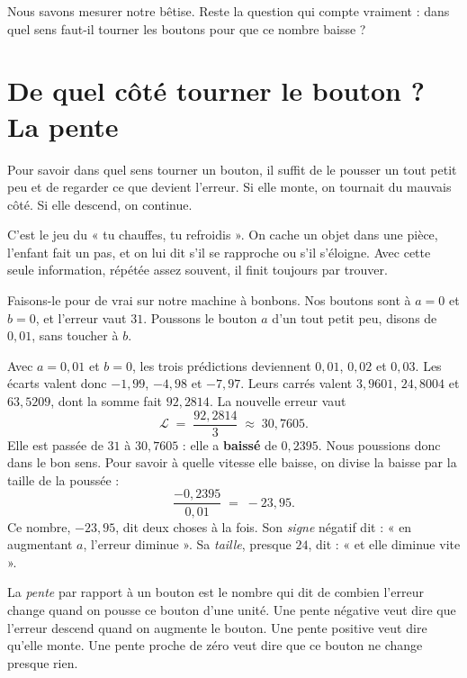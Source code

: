 Nous savons mesurer notre bêtise. Reste la question qui compte vraiment :
dans quel sens faut-il tourner les boutons pour que ce nombre baisse ?

\section{De quel côté tourner le bouton ? La pente}

\begin{enclair}
Pour savoir dans quel sens tourner un bouton, il suffit de le pousser un tout
petit peu et de regarder ce que devient l'erreur. Si elle monte, on tournait
du mauvais côté. Si elle descend, on continue.
\end{enclair}

C'est le jeu du « tu chauffes, tu refroidis ». On cache un objet dans une
pièce, l'enfant fait un pas, et on lui dit s'il se rapproche ou s'il
s'éloigne. Avec cette seule information, répétée assez souvent, il finit
toujours par trouver.

Faisons-le pour de vrai sur notre machine à bonbons. Nos boutons sont à
$a = 0$ et $b = 0$, et l'erreur vaut $31$. Poussons le bouton $a$ d'un tout
petit peu, disons de $0{,}01$, sans toucher à $b$.

\begin{exemple}
Avec $a = 0{,}01$ et $b = 0$, les trois prédictions deviennent $0{,}01$,
$0{,}02$ et $0{,}03$. Les écarts valent donc $-1{,}99$, $-4{,}98$ et
$-7{,}97$. Leurs carrés valent $3{,}9601$, $24{,}8004$ et $63{,}5209$, dont
la somme fait $92{,}2814$. La nouvelle erreur vaut
\[
  \mathcal{L} \;=\; \frac{92{,}2814}{3} \;\approx\; 30{,}7605 .
\]
Elle est passée de $31$ à $30{,}7605$ : elle a \textbf{baissé} de
$0{,}2395$. Nous poussions donc dans le bon sens. Pour savoir à quelle
vitesse elle baisse, on divise la baisse par la taille de la poussée :
\[
  \frac{-0{,}2395}{0{,}01} \;=\; -23{,}95 .
\]
Ce nombre, $-23{,}95$, dit deux choses à la fois. Son \emph{signe} négatif
dit : « en augmentant $a$, l'erreur diminue ». Sa \emph{taille}, presque
$24$, dit : « et elle diminue vite ».
\end{exemple}

\begin{definition}[La pente][pente]
La \emph{pente} par rapport à un bouton est le nombre qui dit de combien
l'erreur change quand on pousse ce bouton d'une unité. Une pente négative
veut dire que l'erreur descend quand on augmente le bouton. Une pente
positive veut dire qu'elle monte. Une pente proche de zéro veut dire que ce
bouton ne change presque rien.
\end{definition}


